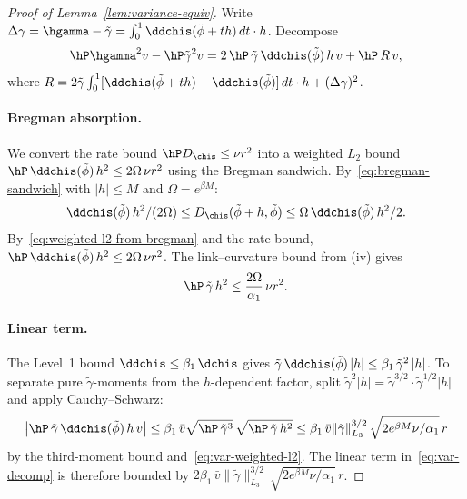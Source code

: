 \documentclass{article}
\begin{document}
\begin{proof}[Proof of Lemma~\ref{lem:variance-equiv}]
Write $\Delta\gamma = \hgamma - \tilde\gamma
  = \int_0^1 \ddchis(\tilde\phi + th)\, dt \cdot h$.
Decompose
\begin{equation}\label{eq:var-decomp}
\hP \hgamma^2 v - \hP \tilde\gamma^2 v
  = 2\, \hP\, \tilde\gamma\, \ddchis(\tilde\phi)\, h\, v
  + \hP\, R\, v,
\end{equation}
where
$R = 2\tilde\gamma \int_0^1
  [\ddchis(\tilde\phi + th) - \ddchis(\tilde\phi)]\, dt \cdot h
  + (\Delta\gamma)^2$.

\paragraph{Bregman absorption.}
We convert the rate bound $\hP D_{\chis} \le \nu r^2$
into a weighted $L_2$ bound
$\hP\, \ddchis(\tilde\phi)\, h^2 \le 2\Omega\, \nu r^2$
using the Bregman sandwich.
By~\eqref{eq:bregman-sandwich}
with $|h| \le M$
and $\Omega = e^{\beta M}$:
\begin{equation}\label{eq:var-bregman-absorb}
\ddchis(\tilde\phi)\, h^2/(2\Omega)
  \le D_{\chis}(\tilde\phi+h, \tilde\phi)
  \le \Omega\, \ddchis(\tilde\phi)\, h^2/2.
\end{equation}
By~\eqref{eq:weighted-l2-from-bregman} and the rate bound,
$\hP\, \ddchis(\tilde\phi)\, h^2 \le 2\Omega\, \nu r^2$.
The link--curvature bound
from (iv)
gives
\begin{equation}\label{eq:var-weighted-l2}
\hP\, \tilde\gamma\, h^2
  \le \frac{2\Omega}{\alpha_1}\, \nu r^2.
\end{equation}

\paragraph{Linear term.}
The Level~1 bound
$\ddchis \le \beta_1\, \dchis$
gives
$\tilde\gamma\, \ddchis(\tilde\phi)\, |h|
  \le \beta_1\, \tilde\gamma^2\, |h|$.
To separate pure $\tilde\gamma$-moments
from the $h$-dependent factor,
split
$\tilde\gamma^2 |h|
  = \tilde\gamma^{3/2} \cdot \tilde\gamma^{1/2}|h|$
and apply Cauchy--Schwarz:
\[
\abs{\hP\, \tilde\gamma\, \ddchis(\tilde\phi)\, h\, v}
  \le \beta_1\, \bar{v} \sqrt{\hP\, \tilde\gamma^3}\,
    \sqrt{\hP\, \tilde\gamma\, h^2}
  \le \beta_1\, \bar{v} \|\tilde\gamma\|_{L_3}^{3/2}\,
    \sqrt{2 e^{\beta M}\nu/\alpha_1}\, r
\]
by the third-moment bound and~\eqref{eq:var-weighted-l2}.
The linear term in~\eqref{eq:var-decomp}
is therefore bounded by
$2\beta_1\, \bar{v} \|\tilde\gamma\|_{L_3}^{3/2}\,
  \sqrt{2 e^{\beta M}\nu/\alpha_1}\, r$.


\end{proof}
\end{document}
